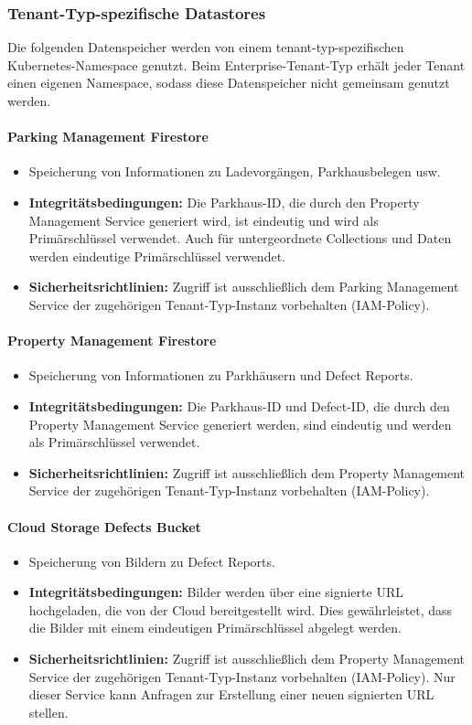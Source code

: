 \subsubsection{Tenant-Typ-spezifische Datastores}
Die folgenden Datenspeicher werden von einem tenant-typ-spezifischen Kubernetes-Namespace genutzt. Beim Enterprise-Tenant-Typ erhält jeder Tenant einen eigenen Namespace, sodass diese Datenspeicher nicht gemeinsam genutzt werden.

\paragraph{Parking Management Firestore}
\begin{itemize}
	\item Speicherung von Informationen zu Ladevorgängen, Parkhausbelegen usw.
	\item \textbf{Integritätsbedingungen:} Die Parkhaus-ID, die durch den Property Management Service generiert wird, ist eindeutig und wird als Primärschlüssel verwendet. Auch für untergeordnete Collections und Daten werden eindeutige Primärschlüssel verwendet.
	\item \textbf{Sicherheitsrichtlinien:} Zugriff ist ausschließlich dem Parking Management Service der zugehörigen Tenant-Typ-Instanz vorbehalten (IAM-Policy).
\end{itemize}

\paragraph{Property Management Firestore}
\begin{itemize}
	\item Speicherung von Informationen zu Parkhäusern und Defect Reports.
	\item \textbf{Integritätsbedingungen:} Die Parkhaus-ID und Defect-ID, die durch den Property Management Service generiert werden, sind eindeutig und werden als Primärschlüssel verwendet.
	\item \textbf{Sicherheitsrichtlinien:} Zugriff ist ausschließlich dem Property Management Service der zugehörigen Tenant-Typ-Instanz vorbehalten (IAM-Policy).
\end{itemize}

\paragraph{Cloud Storage Defects Bucket}
\begin{itemize}
	\item Speicherung von Bildern zu Defect Reports.
	\item \textbf{Integritätsbedingungen:} Bilder werden über eine signierte URL hochgeladen, die von der Cloud bereitgestellt wird. Dies gewährleistet, dass die Bilder mit einem eindeutigen Primärschlüssel abgelegt werden.
	\item \textbf{Sicherheitsrichtlinien:} Zugriff ist ausschließlich dem Property Management Service der zugehörigen Tenant-Typ-Instanz vorbehalten (IAM-Policy). Nur dieser Service kann Anfragen zur Erstellung einer neuen signierten URL stellen.
\end{itemize}

